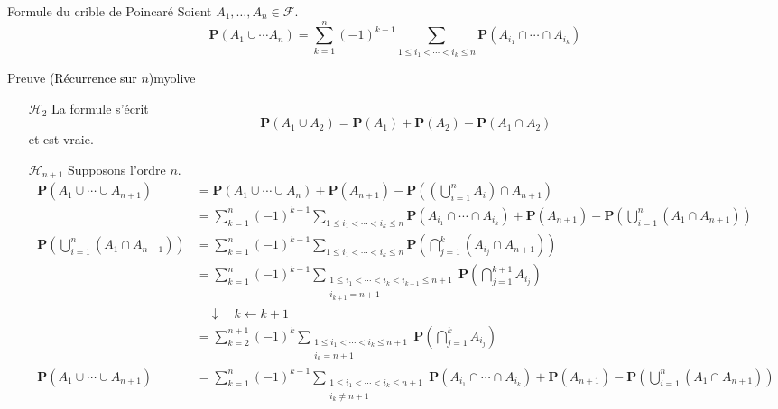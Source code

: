     \begin{prop}{Formule du crible de Poincaré}{}
        Soient $A_1, \ldots, A_n \in \mathcal{F}$. 
        \[ \mathbf{P}(A_1 \cup \cdots A_n) = \sum_{k = 1}^n (-1)^{k - 1} \sum_{1 \leq i_1 < \cdots < i_k \leq n} \mathbf{P}(A_{i_1} \cap \cdots \cap A_{i_k}) \]   
    \end{prop}

    \begin{demo}{Preuve \textcolor{black}{(Récurrence sur $n$)}}{myolive}
        \begin{itemize}
            \item[$\mathcal{H}_2$] \quad La formule s’écrit 
            \[ \mathbf{P}(A_1 \cup A_2) = \mathbf{P}(A_1) + \mathbf{P}(A_2) - \mathbf{P}(A_1 \cap A_2) \]   
            et est vraie.
            \item[$\mathcal{H}_{n + 1}$] \quad Supposons l’ordre $n$. 
            \begin{align*}
                \mathbf{P}(A_1 \cup \cdots \cup A_{n+1}) 
                &= \mathbf{P}(A_1 \cup \cdots \cup A_n) + \mathbf{P}(A_{n + 1}) - \mathbf{P}\left(\left(\bigcup_{i = 1}^n A_i\right) \cap A_{n+1} \right) \\
                &= \sum_{k = 1}^{n} (-1)^{k-1} \sum_{1 \leq i_1 < \cdots < i_k \leq n} \mathbf{P}(A_{i_1} \cap \cdots \cap A_{i_k}) + \mathbf{P}(A_{n+1}) - \mathbf{P}\left(\bigcup_{i = 1}^n (A_1 \cap A_{n + 1})\right) \\
                \mathbf{P}\left(\bigcup_{i = 1}^n (A_1 \cap A_{n + 1})\right) &= \sum_{k=1}^n (-1)^{k-1} \sum_{1 \leq i_1 < \cdots < i_k \leq n} \mathbf{P}\left(\bigcap_{j = 1}^k (A_{i_j} \cap A_{n+1})\right) \\
                &= \sum_{k=1}^n (-1)^{k-1} \sum_{\substack{1 \leq i_1 < \cdots < i_k < i_{k+1} \leq n+1 \\ i_{k+1} = n+1}} \mathbf{P}\left(\bigcap_{j = 1}^{k+1} A_{i_j}\right) \\
                &\quad \downarrow \quad k \leftarrow k+1 \\
                &= \sum_{k = 2}^{n+1} (-1)^k \sum_{\substack{1 \leq i_1 < \cdots < i_k\leq n+1 \\ i_{k} = n+1}} \mathbf{P}\left(\bigcap_{j = 1}^{k} A_{i_j}\right) \\
                \mathbf{P}(A_1 \cup \cdots \cup A_{n+1})
                &= \sum_{k = 1}^{n} (-1)^{k-1} \sum_{\substack{1 \leq i_1 < \cdots < i_k \leq n+1 \\ i_k \neq n+1}} \mathbf{P}(A_{i_1} \cap \cdots \cap A_{i_k}) + \mathbf{P}(A_{n+1}) - \mathbf{P}\left(\bigcup_{i = 1}^n (A_1 \cap A_{n + 1})\right) \\

\end{align*}
\end{itemize}
\end{demo}

